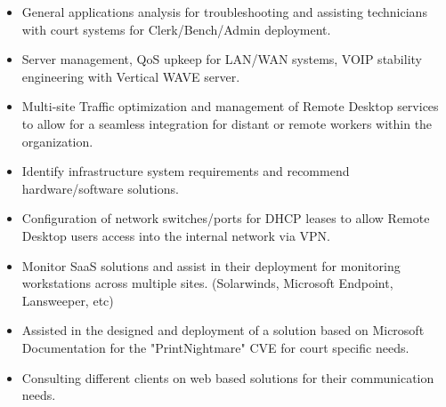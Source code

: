 \documentclass[10pt,a4paper,ragged2e,withhyper]{altacv}
\begin{document}
    \makecvheader
    

    
    \begin{paracol}{2}

     
      \begin{itemize}
          \item General applications analysis for troubleshooting and assisting technicians with court systems for Clerk/Bench/Admin deployment.
          \item Server management, QoS upkeep for LAN/WAN systems, VOIP stability engineering with Vertical WAVE server.
          \item Multi-site Traffic optimization and management of Remote Desktop services to allow for a seamless integration for distant or remote workers within the organization.
          \item Identify infrastructure system requirements and recommend hardware/software solutions.
          \item Configuration of network switches/ports for DHCP leases to allow Remote Desktop users access into the internal network via VPN.
          \item Monitor SaaS solutions and assist in their deployment for monitoring workstations across multiple sites. (Solarwinds, Microsoft Endpoint, Lansweeper, etc)
          \item Assisted in the designed and deployment of a solution based on Microsoft Documentation for the "PrintNightmare" CVE for court specific needs.
      \end{itemize}
            \divider
      \begin{itemize}
          \item Consulting different clients on web based solutions for their communication needs.

\end{itemize}
\end{paracol}
\end{document}
